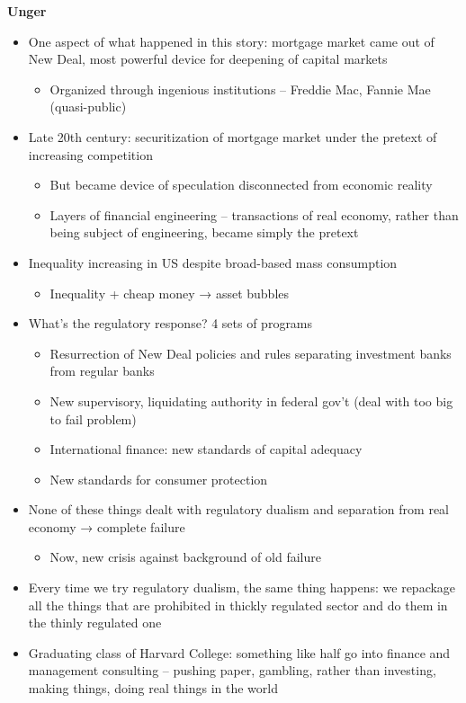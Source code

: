 \textbf{Unger}

\begin{itemize}
\tightlist
\item
  One aspect of what happened in this story: mortgage market came out of
  New Deal, most powerful device for deepening of capital markets

  \begin{itemize}
  \tightlist
  \item
    Organized through ingenious institutions -- Freddie Mac, Fannie Mae
    (quasi-public)
  \end{itemize}
\item
  Late 20th century: securitization of mortgage market under the pretext
  of increasing competition

  \begin{itemize}
  \tightlist
  \item
    But became device of speculation disconnected from economic reality
  \item
    Layers of financial engineering -- transactions of real economy,
    rather than being subject of engineering, became simply the pretext
  \end{itemize}
\item
  Inequality increasing in US despite broad-based mass consumption

  \begin{itemize}
  \tightlist
  \item
    Inequality + cheap money → asset bubbles
  \end{itemize}
\item
  What's the regulatory response? 4 sets of programs

  \begin{itemize}
  \tightlist
  \item
    Resurrection of New Deal policies and rules separating investment
    banks from regular banks
  \item
    New supervisory, liquidating authority in federal gov't (deal with
    too big to fail problem)
  \item
    International finance: new standards of capital adequacy
  \item
    New standards for consumer protection
  \end{itemize}
\item
  None of these things dealt with regulatory dualism and separation from
  real economy → complete failure

  \begin{itemize}
  \tightlist
  \item
    Now, new crisis against background of old failure
  \end{itemize}
\item
  Every time we try regulatory dualism, the same thing happens: we
  repackage all the things that are prohibited in thickly regulated
  sector and do them in the thinly regulated one
\item
  Graduating class of Harvard College: something like half go into
  finance and management consulting -- pushing paper, gambling, rather
  than investing, making things, doing real things in the world


\end{itemize}
